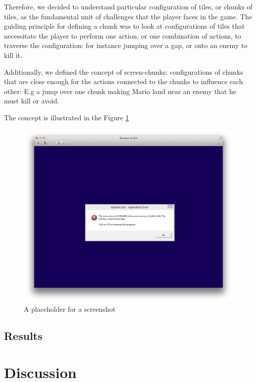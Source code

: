 \documentclass{llncs}
\begin{document}
Therefore, we decided to understand particular configuration of tiles, or chunks of tiles, as the fundamental unit of challenges that the player faces in the game. The guiding principle for defining a chunk was to look at configurations of tiles that  necessitate the player to perform one action, or one combination of actions, to traverse the configuration: for instance jumping over a gap, or onto an enemy to kill it.

Additionally, we defined the concept of screen-chunks: configurations of chunks that are close enough for the actions connected to the chunks to influence each other: E.g a jump over one chunk making Mario land near an enemy that he must kill or avoid.

The concept is illustrated in the Figure \ref{fig:screenshot1}
\begin{figure}
\centering
\includegraphics[scale=0.75]{screenshot1.pdf}
\caption{A placeholder for a screenshot}
\label{fig:screenshot1}
\end{figure}

\subsection{Results}

\section{Discussion}


\end{document}
